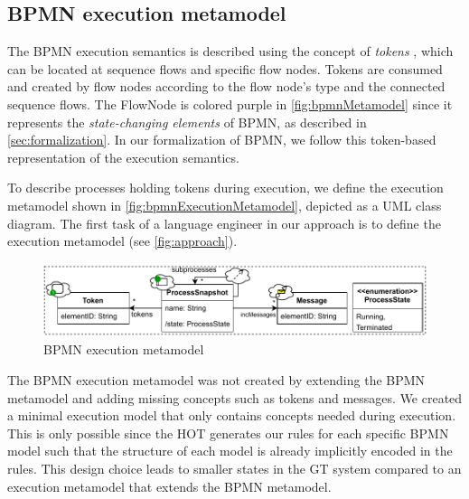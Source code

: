 \documentclass{lmcs} %
\begin{document}
\subsection{BPMN execution metamodel}

The BPMN execution semantics is described using the concept of \textit{tokens} \cite{objectmanagementgroupBusinessProcessModel2013, freundRealLifeBPMNUsing2019}, which can be located at sequence flows and specific flow nodes.
Tokens are consumed and created by flow nodes according to the flow node's type and the connected sequence flows.
The \textsf{FlowNode} is colored purple in \autoref{fig:bpmnMetamodel} since it represents the \textit{state-changing elements} of BPMN, as described in \autoref{sec:formalization}.
In our formalization of BPMN, we follow this token-based representation of the execution semantics.

To describe processes holding tokens during execution, we define the execution metamodel shown in \autoref{fig:bpmnExecutionMetamodel}, depicted as a UML class diagram.
The first task of a language engineer in our approach is to define the execution metamodel (see \autoref{fig:approach}).

\begin{figure}[ht]
  \centering
  \includegraphics[width=1\linewidth]{images/bpmn_semantics-typegraph.pdf}
  \caption{BPMN execution metamodel}
  \label{fig:bpmnExecutionMetamodel}
\end{figure}

The BPMN execution metamodel was not created by extending the BPMN metamodel and adding missing concepts such as tokens and messages.
We created a minimal execution model that only contains concepts needed during execution.
This is only possible since the HOT generates our rules for each specific BPMN model such that the structure of each model is already implicitly encoded in the rules.
This design choice leads to smaller states in the GT system compared to an execution metamodel that extends the BPMN metamodel.
\end{document}
